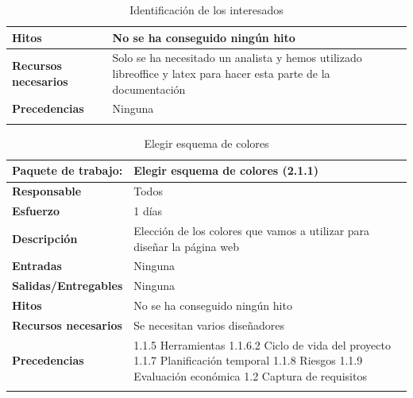 \documentclass{report}
\begin{document}
\begin{center}
\begin{longtable}{|p{6cm}|p{6cm}|}
                    \hline
                    \textbf{Hitos} & No se ha conseguido ningún hito\\
                    \hline
                    \textbf{Recursos necesarios} & Solo se ha necesitado un analista y hemos utilizado libreoffice y latex para hacer esta parte de la documentación\\
                    \hline
                    \textbf{Precedencias} & Ninguna\\
                    \hline
                    \caption{Identificación de los interesados}
                \end{longtable}
                \begin{longtable}{|p{6cm}|p{6cm}|}
                    \hline
                    \textbf{Paquete de trabajo:} & Elegir esquema de colores (2.1.1)\\
                    \hline
                    \textbf{Responsable} & Todos\\
                    \hline
                    \textbf{Esfuerzo} & 1 días\\
                    \hline
                    \textbf{Descripción} & Elección de los colores que vamos a utilizar para diseñar la página web\\
                    \hline
                    \textbf{Entradas} & Ninguna\\
                    \hline
                    \textbf{Salidas/Entregables} & Ninguna \\
                    \hline
                    \textbf{Hitos} & No se ha conseguido ningún hito\\
                    \hline
                    \textbf{Recursos necesarios} & Se necesitan varios diseñadores\\
                    \hline
                    \textbf{Precedencias} & 1.1.5 Herramientas
                                            1.1.6.2 Ciclo de vida del proyecto
                                            1.1.7 Planificación temporal
                                            1.1.8 Riesgos
                                            1.1.9 Evaluación económica
                                            1.2 Captura de requisitos\\
                    \hline
                    \caption{Elegir esquema de colores}
                \end{longtable}
                \clearpage
                \begin{longtable}{|p{6cm}|p{6cm}|}

\end{longtable}
\end{center}
\end{document}
